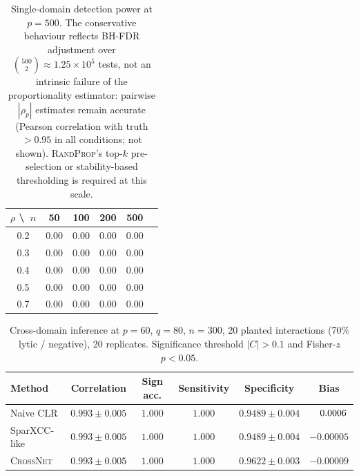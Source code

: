 \documentclass[11pt]{article}
\newcommand{\randprop}{\textsc{RandProp}\xspace}
\newcommand{\crossnet}{\textsc{CrossNet}\xspace}
\theoremstyle{plain}
\begin{document}
\begin{table}[h]
\centering
\caption{Single-domain detection power at $p = 500$. The conservative
behaviour reflects BH-FDR adjustment over
$\binom{500}{2} \approx 1.25\times 10^{5}$ tests, not an intrinsic failure
of the proportionality estimator: pairwise $|\rho_p|$ estimates remain
accurate (Pearson correlation with truth $> 0.95$ in all conditions; not
shown). \randprop's top-$k$ pre-selection or stability-based
thresholding \citep{Liu2010} is required at this scale.}
\label{tab:power-p500}
\begin{tabular}{@{}cccccc@{}}
\toprule
$\rho$ \textbackslash\ $n$ & 50 & 100 & 200 & 500 \\
\midrule
0.2 & 0.00 & 0.00 & 0.00 & 0.00 \\
0.3 & 0.00 & 0.00 & 0.00 & 0.00 \\
0.4 & 0.00 & 0.00 & 0.00 & 0.00 \\
0.5 & 0.00 & 0.00 & 0.00 & 0.00 \\
0.7 & 0.00 & 0.00 & 0.00 & 0.00 \\
\bottomrule
\end{tabular}
\end{table}

\begin{table}[h]
\centering
\caption{Cross-domain inference at $p = 60$, $q = 80$, $n = 300$,
20 planted interactions (70\% lytic / negative), 20 replicates.
Significance threshold $|C| > 0.1$ and Fisher-$z$ $p < 0.05$.}
\label{tab:cross-domain}
\begin{tabular}{@{}lccccc@{}}
\toprule
Method & Correlation & Sign acc. & Sensitivity & Specificity & Bias \\
\midrule
Naive CLR & $0.993\pm 0.005$ & $1.000$ & $1.000$ & $0.9489\pm 0.004$ & $\hphantom{-}\,0.0006$ \\
SparXCC-like & $0.993\pm 0.005$ & $1.000$ & $1.000$ & $0.9489\pm 0.004$ & $-0.00005$ \\
\crossnet & $0.993\pm 0.005$ & $1.000$ & $1.000$ & $\mathbf{0.9622\pm 0.003}$ & $-0.00009$ \\
\bottomrule
\end{tabular}
\end{table}
\end{document}
